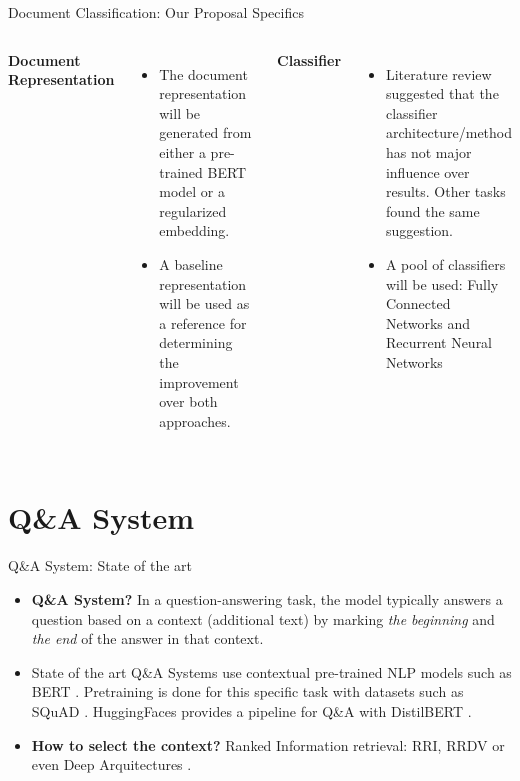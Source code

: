\documentclass[aspectratio=169]{beamer}
\begin{document}
\begin{frame}{Document Classification: Our Proposal Specifics}
    \begin{columns}
            \textbf{Document Representation}
            \begin{itemize}
                \item The document representation will be generated from either a pre-trained BERT model or a regularized embedding.
                \item A baseline representation will be used as a reference for determining the improvement over both approaches.
            \end{itemize}
        
            \textbf{Classifier}
            \begin{itemize}
                \item Literature review suggested that the classifier architecture/method has not major influence over results. Other tasks found the same suggestion.
                \item A pool of classifiers will be used: Fully Connected Networks and Recurrent Neural Networks
            \end{itemize}
    \end{columns}
\end{frame}


\section{Q\&A System}

\begin{frame}{Q\&A System: State of the art}
    \begin{itemize}
        \item \textbf{Q\&A System?} In a question-answering task, the model typically answers a question based on a context (additional text) by marking \textit{the beginning} and \textit{the end} of the answer in that context. 
    
        \item State of the art Q\&A Systems use contextual pre-trained NLP models such as BERT \cite{BertQA}. Pretraining is done for this specific task with datasets such as SQuAD \cite{squad}. HuggingFaces provides a pipeline for Q\&A with DistilBERT \cite{9DistilBERT}.
        
        \item \textbf{How to select the context?} Ranked Information retrieval: RRI, RRDV or even Deep Arquitectures \cite{DeepRanked}.
    \end{itemize}
\end{frame}
\end{document}

